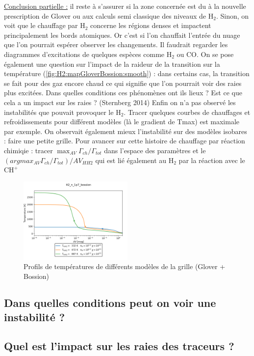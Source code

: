 \underline{Conclusion partielle :} il reste à s'assurer si la zone concernée est du à la nouvelle prescription de Glover ou aux calculs semi classique des niveaux de $\mathrm{H}_2$. Sinon, on voit que le chauffage par $\mathrm{H}_2$ concerne les régions denses et impactent principalement les bords atomiques. Or c'est si l'on chauffait l'entrée du nuage que l'on pourrait espérer observer les changements. Il faudrait regarder les diagrammes d'excitations de quelques espèces comme $\mathrm{H}_2$ ou $\mathrm{CO}$. On se pose également une question sur l'impact de la raideur de la transition sur la température (\autoref{fig:H2:mapGloverBossion:smooth}) : dans certains cas, la transition se fait pour des gaz encore chaud ce qui signifie que l'on pourrait voir des raies plus excitées. Dans quelles conditions ces phénomènes ont ils lieux ? Est ce que cela a un impact sur les raies ? (Sternberg 2014) Enfin on n'a pas observé les instabilités que pouvait provoquer le $\mathrm{H}_2$. Tracer quelques courbes de chauffages et refroidissements pour différent modèles (là le gradient de Tmax) est maximale par exemple. On observait également mieux l'instabilité sur des modèles isobares : faire une petite grille. Pour avancer sur cette histoire de chauffage par réaction chimiqie : tracer $\max_{AV} \Gamma_{ch}/\Gamma_{tot}$ dans l'espace des paramètres et le $(argmax_{AV}  \Gamma_{ch}/\Gamma_{tot})/AV_{HH2}$ qui est lié également au $\mathrm{H}_2$ par la réaction avec le $\mathrm{CH}^+$

\begin{figure}[th!]
        \centering \includegraphics[trim = {0 0 0 0},clip,width=0.5\textwidth]{figure/H2/mapGloverBossion/H2_n_1p7_bossion_d3p5r2p5_d4p5r2p5_d5p5r2p5.png}
        \caption{Profils de températures de différents modèles de la grille (Glover + Bossion)}
        \label{fig:H2:mapGloverBossion:smooth}
\end{figure}

\subsection{Dans quelles conditions peut on voir une instabilité ?}
\subsection{Quel est l'impact sur les raies des traceurs ?}

